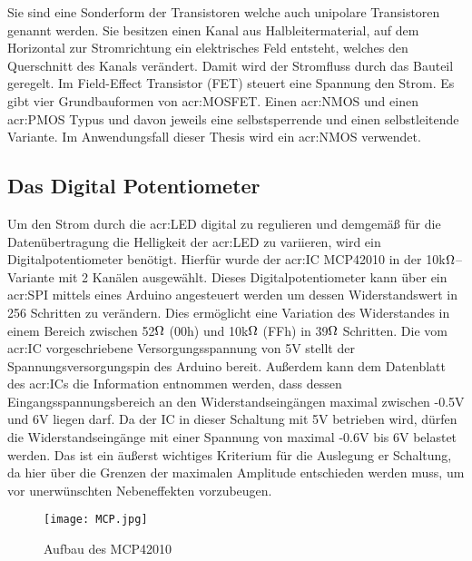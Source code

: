 Sie sind eine Sonderform der Transistoren welche auch unipolare Transistoren genannt werden. Sie besitzen einen Kanal aus Halbleitermaterial, auf dem Horizontal zur Stromrichtung ein elektrisches Feld entsteht, welches den Querschnitt des Kanals verändert. Damit wird der Stromfluss durch das Bauteil geregelt. Im Field-Effect Transistor (FET) steuert eine Spannung den Strom. Es gibt vier Grundbauformen von \gls{acr:MOSFET}. Einen \gls{acr:NMOS} und einen \gls{acr:PMOS} Typus und davon jeweils eine selbstsperrende und einen selbstleitende Variante. Im Anwendungsfall dieser Thesis wird ein \gls{acr:NMOS} verwendet. \cite{heringElektrotechnikUndElektronik2018}

\newpage
\subsection{Das Digital Potentiometer}
\label{subsec:Unterabschnitt12}

Um den Strom durch die \gls{acr:LED} digital zu regulieren und demgemäß für die Datenübertragung die Helligkeit der \gls{acr:LED} zu variieren, wird ein Digitalpotentiometer benötigt. Hierfür wurde der \gls{acr:IC} MCP42010 in der 10k$\ohm$–Variante mit 2 Kanälen ausgewählt. Dieses Digitalpotentiometer kann über ein \gls{acr:SPI} mittels eines Arduino angesteuert werden um dessen Widerstandswert in 256 Schritten zu verändern. Dies ermöglicht eine Variation des Widerstandes in einem Bereich zwischen 52$\ohm$ (00h) und 10k$\ohm$ (FFh) in 39$\ohm$ Schritten. 
Die vom \gls{acr:IC} vorgeschriebene Versorgungsspannung von 5V stellt der Spannungsversorgungspin des Arduino bereit. Außerdem kann dem Datenblatt des \gls{acr:IC}s die Information entnommen werden, dass dessen Eingangsspannungsbereich an den Widerstandseingängen maximal zwischen -0.5V und 6V liegen darf. Da der IC in dieser Schaltung mit 5V betrieben wird, dürfen die Widerstandseingänge mit einer Spannung von maximal -0.6V bis 6V belastet werden. Das ist ein äußerst wichtiges Kriterium für die Auslegung er Schaltung, da hier über die Grenzen der maximalen Amplitude entschieden werden muss, um vor unerwünschten Nebeneffekten vorzubeugen.

\begin{figure}[H]
	\centering
	\texttt{[image: MCP.jpg]}
	\caption[Aufbau des MCP42010]{Aufbau des MCP42010} 
	\cite{MCP42}
	\label{fig:MCP}
\end{figure}

